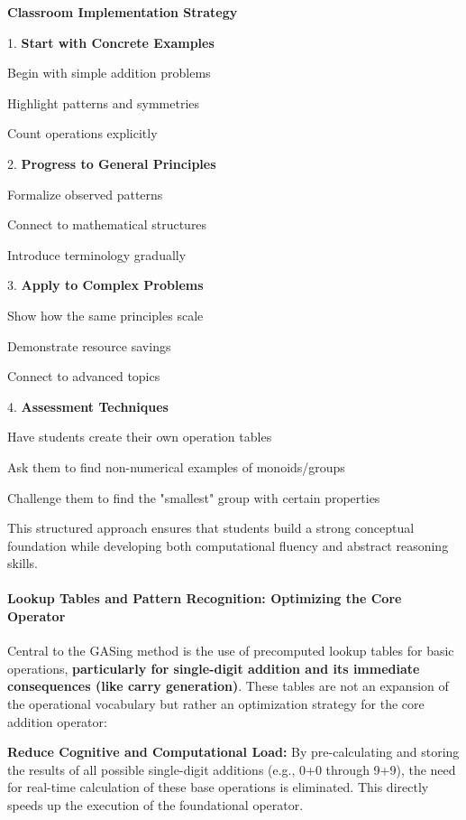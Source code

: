 \textbf{Classroom Implementation Strategy}

1. \textbf{Start with Concrete Examples}

\noindent Begin with simple addition problems


\noindent Highlight patterns and symmetries


\noindent Count operations explicitly


2. \textbf{Progress to General Principles}

\noindent Formalize observed patterns


\noindent Connect to mathematical structures


\noindent Introduce terminology gradually


3. \textbf{Apply to Complex Problems}

\noindent Show how the same principles scale


\noindent Demonstrate resource savings


\noindent Connect to advanced topics


4. \textbf{Assessment Techniques}

\noindent Have students create their own operation tables


\noindent Ask them to find non-numerical examples of monoids/groups


\noindent Challenge them to find the "smallest" group with certain properties


This structured approach ensures that students build a strong conceptual foundation while developing both computational fluency and abstract reasoning skills.
\paragraph{Lookup Tables and Pattern Recognition: Optimizing the Core Operator}

Central to the GASing method is the use of precomputed lookup tables for basic operations, \textbf{particularly for single-digit addition and its immediate consequences (like carry generation)}. These tables are not an expansion of the operational vocabulary but rather an optimization strategy for the core addition operator:


\noindent\textbf{\textbf{Reduce Cognitive and Computational Load}:} By pre-calculating and storing the results of all possible single-digit additions (e.g., 0+0 through 9+9), the need for real-time calculation of these base operations is eliminated. This directly speeds up the execution of the foundational operator.


